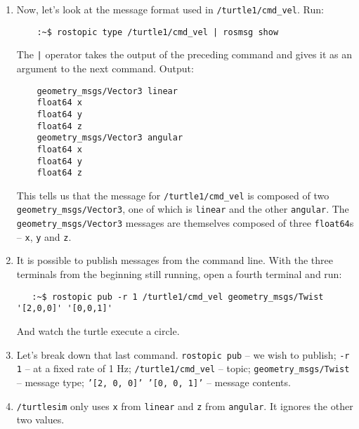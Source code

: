 \documentclass{article}
\begin{document}
\begin{enumerate}
        \item Now, let's look at the message format used in \texttt{/turtle1/cmd\_vel}. Run:
        \begin{verbatim}
    :~$ rostopic type /turtle1/cmd_vel | rosmsg show
        \end{verbatim}
        The \texttt{|} operator takes the output of the preceding command and gives it as an argument 
        to the next command. Output:
        \begin{verbatim}
    geometry_msgs/Vector3 linear
    float64 x
    float64 y
    float64 z
    geometry_msgs/Vector3 angular
    float64 x
    float64 y
    float64 z
        \end{verbatim}
        This tells us that the message for \texttt{/turtle1/cmd\_vel} is composed of two \texttt{geometry\_msgs/Vector3},
        one of which is \texttt{linear} and the other \texttt{angular}. The \texttt{geometry\_msgs/Vector3} messages are themselves composed of
        three \texttt{float64}s -- \texttt{x}, \texttt{y} and \texttt{z}.
        \newpage
        \item It is possible to publish messages from the command line.
         With the three terminals from the beginning still running, open a fourth terminal and run:
        \begin{verbatim}
   :~$ rostopic pub -r 1 /turtle1/cmd_vel geometry_msgs/Twist '[2,0,0]' '[0,0,1]'
        \end{verbatim}
        And watch the turtle execute a circle.
        \item Let's break down that last command. \texttt{rostopic pub} -- we wish to publish; \texttt{-r 1} -- at a fixed rate of 1 Hz;
         \texttt{/turtle1/cmd\_vel} -- topic; \texttt{geometry\_msgs/Twist} -- message type; \texttt{'[2, 0, 0]' '[0, 0, 1]'} -- message contents.
        \item \texttt{/turtlesim} only uses \texttt{x} from \texttt{linear} and \texttt{z} from \texttt{angular}. It ignores the other two values.
        

\end{enumerate}
\end{document}
